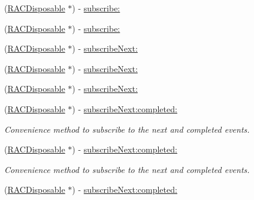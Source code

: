 \begin{DoxyCompactItemize}
\item 
(\mbox{\hyperlink{interface_r_a_c_disposable}{R\+A\+C\+Disposable}} $\ast$) -\/ \mbox{\hyperlink{interface_r_a_c_signal_aeab76d632d98bbc321ec5e19575377eb}{subscribe\+:}}
\item 
(\mbox{\hyperlink{interface_r_a_c_disposable}{R\+A\+C\+Disposable}} $\ast$) -\/ \mbox{\hyperlink{interface_r_a_c_signal_aeab76d632d98bbc321ec5e19575377eb}{subscribe\+:}}
\item 
(\mbox{\hyperlink{interface_r_a_c_disposable}{R\+A\+C\+Disposable}} $\ast$) -\/ \mbox{\hyperlink{interface_r_a_c_signal_a50d000f05e61411c438e616475deb7f8}{subscribe\+Next\+:}}
\item 
(\mbox{\hyperlink{interface_r_a_c_disposable}{R\+A\+C\+Disposable}} $\ast$) -\/ \mbox{\hyperlink{interface_r_a_c_signal_a50d000f05e61411c438e616475deb7f8}{subscribe\+Next\+:}}
\item 
(\mbox{\hyperlink{interface_r_a_c_disposable}{R\+A\+C\+Disposable}} $\ast$) -\/ \mbox{\hyperlink{interface_r_a_c_signal_a50d000f05e61411c438e616475deb7f8}{subscribe\+Next\+:}}
\item 
\mbox{\label{interface_r_a_c_signal_afa988fdb4bcfe4d9b7b944879d163a52}} 
(\mbox{\hyperlink{interface_r_a_c_disposable}{R\+A\+C\+Disposable}} $\ast$) -\/ \mbox{\hyperlink{interface_r_a_c_signal_afa988fdb4bcfe4d9b7b944879d163a52}{subscribe\+Next\+:completed\+:}}
\begin{DoxyCompactList}\small\item\em Convenience method to subscribe to the {\ttfamily next} and {\ttfamily completed} events. \end{DoxyCompactList}\item 
\mbox{\label{interface_r_a_c_signal_afa988fdb4bcfe4d9b7b944879d163a52}} 
(\mbox{\hyperlink{interface_r_a_c_disposable}{R\+A\+C\+Disposable}} $\ast$) -\/ \mbox{\hyperlink{interface_r_a_c_signal_afa988fdb4bcfe4d9b7b944879d163a52}{subscribe\+Next\+:completed\+:}}
\begin{DoxyCompactList}\small\item\em Convenience method to subscribe to the {\ttfamily next} and {\ttfamily completed} events. \end{DoxyCompactList}\item 
\mbox{\label{interface_r_a_c_signal_afa988fdb4bcfe4d9b7b944879d163a52}} 
(\mbox{\hyperlink{interface_r_a_c_disposable}{R\+A\+C\+Disposable}} $\ast$) -\/ \mbox{\hyperlink{interface_r_a_c_signal_afa988fdb4bcfe4d9b7b944879d163a52}{subscribe\+Next\+:completed\+:}}

\end{DoxyCompactItemize}
